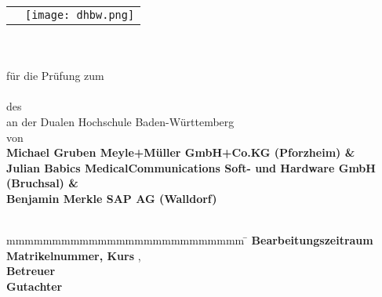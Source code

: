 \begin{titlepage}
	\begin{longtable}{p{} p{}}
	  {} & 
	  {\texttt{[image: dhbw.png]}}
	\end{longtable}
	\enlargethispage{20mm}
	\begin{center}
	  \vspace*{12mm}	{\LARGE\bf \titel }\\
	  \vspace*{12mm}	{\large\bf \arbeit}\\
	  \vspace*{12mm}	für die Prüfung zum\\
	  \vspace*{3mm} 	{\bf \abschluss}\\
	  \vspace*{12mm}	des \studiengang\\
	  \vspace*{3mm} 	an der Dualen Hochschule Baden-Württemberg \dhbw\\
	  \vspace*{12mm}	von\\
	  \vspace*{3mm} 	{\large\bf Michael Gruben \normalsize\rm Meyle+Müller
	  GmbH+Co.KG (Pforzheim) \phantom{iiiiibH (Bruchsal)     }\&}\\
	  \vspace*{3mm} 	{\large\bf Julian Babics \normalsize\rm MedicalCommunications
	  Soft- und Hardware GmbH (Bruchsal) \&}\\
	  \vspace*{3mm} 	{\large\bf Benjamin Merkle \normalsize\rm SAP AG (Walldorf)
	  \phantom{mniiiiiiiiiiiiiiiiiiiiiiiiiiiiiiiiiiiiibH (Bruchsal)}}\\
	  \vspace*{12mm}	\datumAbgabe\\
	\end{center}
	\vfill
	\begin{spacing}{1.2}
	\begin{tabbing}
		mmmmmmmmmmmmmmmmmmmmmmmmmm     \= \kill
		\textbf{Bearbeitungszeitraum}  \>  \zeitraum\\
		\textbf{Matrikelnummer, Kurs}  \>  \martrikelnr, \kurs\\
		\textbf{Betreuer}              \>  \betreuer\\
 		\textbf{Gutachter}             \>  \gutachter
	\end{tabbing}
	\end{spacing}
\end{titlepage}